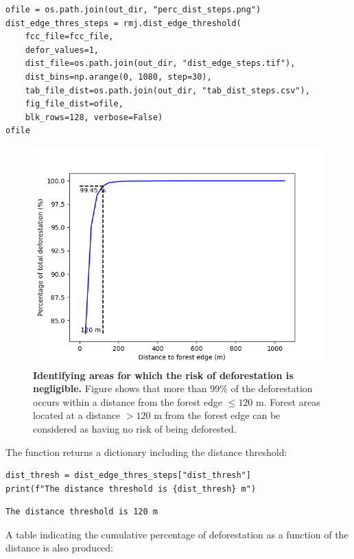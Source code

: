 \documentclass[paper=a4, 12pt, DIV=12]{scrartcl}
\begin{document}
\begin{verbatim}
ofile = os.path.join(out_dir, "perc_dist_steps.png")
dist_edge_thres_steps = rmj.dist_edge_threshold(
    fcc_file=fcc_file,
    defor_values=1,
    dist_file=os.path.join(out_dir, "dist_edge_steps.tif"),
    dist_bins=np.arange(0, 1080, step=30),
    tab_file_dist=os.path.join(out_dir, "tab_dist_steps.csv"),
    fig_file_dist=ofile,
    blk_rows=128, verbose=False)
ofile
\end{verbatim}

\begin{figure}[H]
\centering
\includegraphics[width=0.8\linewidth]{outputs/perc_dist_steps.png}
\caption{\label{fig:orgc2340e1}\textbf{Identifying areas for which the risk of deforestation is negligible.} Figure shows that more than 99\% of the deforestation occurs within a distance from the forest edge \(\leq 120\) m. Forest areas located at a distance \(> 120\) m from the forest edge can be considered as having no risk of being deforested.}
\end{figure}

The function returns a dictionary including the distance threshold:

\begin{verbatim}
dist_thresh = dist_edge_thres_steps["dist_thresh"]
print(f"The distance threshold is {dist_thresh} m")
\end{verbatim}

\begin{verbatim}
The distance threshold is 120 m
\end{verbatim}


A table indicating the cumulative percentage of deforestation as a function of the distance is also produced:
\end{document}
